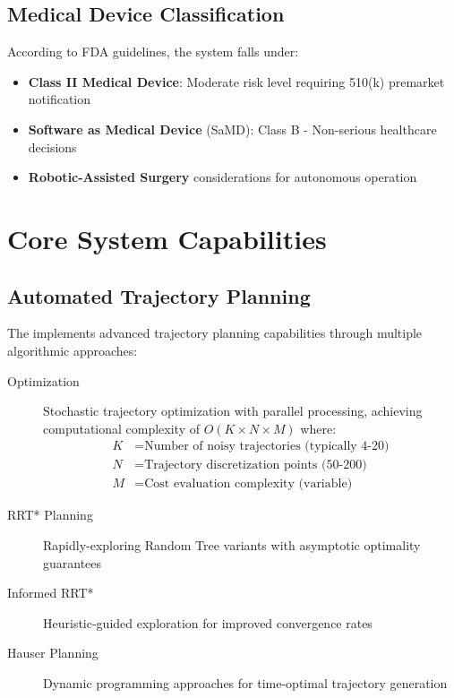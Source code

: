 \subsection{Medical Device Classification}

According to FDA guidelines, the \rus{} system falls under:

\begin{itemize}
    \item \textbf{Class II Medical Device}: Moderate risk level requiring 510(k) premarket notification
    \item \textbf{Software as Medical Device} (SaMD): Class B - Non-serious healthcare decisions
    \item \textbf{Robotic-Assisted Surgery} considerations for autonomous operation
\end{itemize}

\section{Core System Capabilities}
\label{sec:core_capabilities}

\subsection{Automated Trajectory Planning}

The \rus{} implements advanced trajectory planning capabilities through multiple algorithmic approaches:

\begin{description}
    \item[\stomp{} Optimization] Stochastic trajectory optimization with parallel processing, achieving computational complexity of $O(K \times N \times M)$ where:
    \begin{align}
        K &= \text{Number of noisy trajectories (typically 4-20)} \\
        N &= \text{Trajectory discretization points (50-200)} \\
        M &= \text{Cost evaluation complexity (variable)}
    \end{align}
    
    \item[RRT* Planning] Rapidly-exploring Random Tree variants with asymptotic optimality guarantees
    
    \item[Informed RRT*] Heuristic-guided exploration for improved convergence rates
    
    \item[Hauser Planning] Dynamic programming approaches for time-optimal trajectory generation
\end{description}

